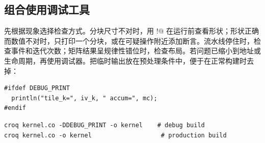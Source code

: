 \subsection*{组合使用调试工具}

先根据现象选择检查方式。分块尺寸不对时，用 \co@println!@ 在运行前查看形状；形状正确而数值不对时，只打印一个分块，或在可疑操作附近添加断言。流水线停住时，检查事件和迭代次数；矩阵结果呈规律性错位时，检查布局。若问题已缩小到地址或生命周期，再使用调试器。把临时输出放在预处理条件中，便于在正常构建时去掉：

\begin{lstlisting}[language=croqtile,caption={用条件编译控制调试输出}]
#ifdef DEBUG_PRINT
  println("tile_k=", iv_k, " accum=", mc);
#endif
\end{lstlisting}

\begin{lstlisting}[language=croqtile,caption={调试构建与正式构建}]
croq kernel.co -DDEBUG_PRINT -o kernel    # debug build
croq kernel.co -o kernel                   # production build
\end{lstlisting}
